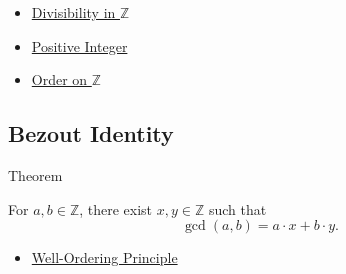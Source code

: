 \begin{dependencies}
\begin{itemize}
  \item \hyperref[def:divisibility-in-z]{Divisibility in $\mathbb{Z}$}
  \item \hyperref[def:positive-integer]{Positive Integer}
  \item \hyperref[def:order-on-z]{Order on $\mathbb{Z}$}
\end{itemize}
\end{dependencies}

\subsection*{Bezout Identity}

\begin{theorembox}{Theorem}
\begin{theorem}
\label{thm:bezout-identity-on-z}
For $a,b\in\mathbb{Z}$, there exist $x,y\in\mathbb{Z}$ such that
\[
\gcd(a,b)=a\cdot x+b\cdot y.
\]
\end{theorem}
\end{theorembox}

\begin{dependencies}
\begin{itemize}
  \item \hyperref[thm:well-ordering-principle]{Well-Ordering Principle}
\end{itemize}
\end{dependencies}
